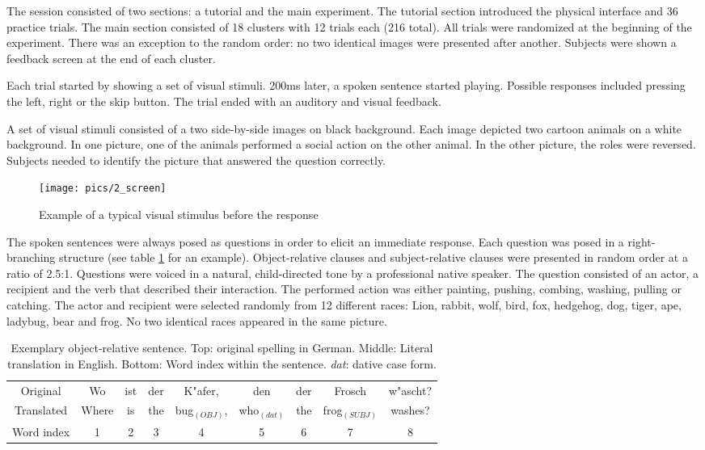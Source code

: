 The session consisted of two sections: a tutorial and the main experiment.
The tutorial section introduced the physical interface and 36 practice trials.
The main section consisted of 18 clusters with 12 trials each (216 total).
All trials were randomized at the beginning of the experiment.
There was an exception to the random order: no two identical images were presented after another.
Subjects were shown a feedback screen at the end of each cluster.

Each trial started by showing a set of visual stimuli.
200ms later, a spoken sentence started playing.
Possible responses included pressing the left, right or the skip button.
The trial ended with an auditory and visual feedback.

A set of visual stimuli consisted of a two side-by-side images on black background.
Each image depicted two cartoon animals on a white background.
In one picture, one of the animals performed a social action on the other animal.
In the other picture, the roles were reversed.
Subjects needed to identify the picture that answered the question correctly.

\begin{figure}[h]
\begin{center}
\vspace*{5mm}
\texttt{[image: pics/2\_screen]}
\caption{\label{2.screen} Example of a typical visual stimulus before the response}
\end{center}
\end{figure}

The spoken sentences were always posed as questions in order to elicit an immediate response.
Each question was posed in a right-branching structure (see table \ref{2.sentences} for an example).
Object-relative clauses and subject-relative clauses were presented in random order at a ratio of 2.5:1.
Questions were voiced in a natural, child-directed tone by a professional native speaker.
The question consisted of an actor, a recipient and the verb that described their interaction.
The performed action was either painting, pushing, combing, washing, pulling or catching.
The actor and recipient were selected randomly from 12 different races: Lion, rabbit, wolf, bird, fox, hedgehog, dog, tiger, ape, ladybug, bear and frog.
No two identical races appeared in the same picture.

\vspace{5mm}
\begin{table}[htb]
\begin{center}
\begin{tabular}{ccccccccc}
Original & Wo & ist & der & K"afer, & den & der & Frosch & w"ascht?\\
Translated & Where & is & the & bug$_{(OBJ)}$, & who$_{(dat)}$ & the & frog$_{(SUBJ)}$ & washes?\\
Word index & 1 & 2 & 3 & 4 & 5 & 6 & 7 & 8
\end{tabular}
\caption{\label{2.sentences} Exemplary object-relative sentence. Top: original spelling in German. Middle: Literal translation in English. Bottom: Word index within the sentence. \emph{dat}: dative case form.}
\end{center}
\end{table}

